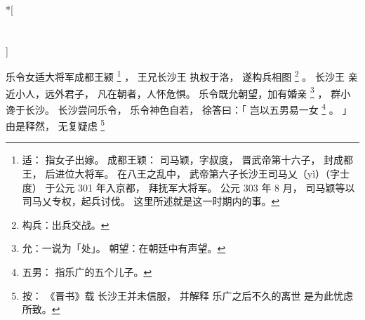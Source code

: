 
\switchcolumn[0]*[\section{}]

乐令女适大将军成都王颍%
\footnote{%
    适：
        指女子出嫁。
    成都王颖：
        司马颖，字叔度，
        晋武帝第十六子，
        封成都王，
        后进位大将军。
        在八王之乱中，
        武帝第六子长沙王司马乂（yì）（字士度）
        于公元 301 年入京都，
        拜抚军大将军。
        公元 303 年 8 月，
        司马颖等以司马乂专权，起兵讨伐。
        这里所述就是这一时期内的事。
}%
，
王兄长沙王
执权于洛，
遂构兵相图%
\footnote{%
    构兵：出兵交战。
}%
。
长沙王
亲近小人，远外君子，
凡在朝者，人怀危惧。
乐令既允朝望，加有婚亲%
\footnote{%
    允：一说为「处」。
    朝望：在朝廷中有声望。
}%
，
群小谗于长沙。
长沙尝问乐令，
乐令神色自若，
徐答曰：「
    岂以五男易一女%
    \footnote{%
        五男：
            指乐广的五个儿子。
    }%
    。
」
由是释然，
无复疑虑%
\footnote{%
    按：
        《晋书》载
        长沙王并未信服，
        并解释
        乐广之后不久的离世
        是为此忧虑所致。
}%

\switchcolumn



